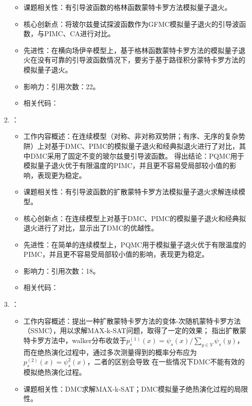 \begin{enumerate}
\begin{itemize}
                \item 课题相关性：有引导波函数的格林函数蒙特卡罗方法模拟量子退火。
                \item 核心创新点：将玻尔兹曼试探波函数作为GFMC模拟量子退火的引导波函数，与PIMC、CA进行对比。
                \item 先进性：在横向场伊辛模型上，基于格林函数蒙特卡罗方法的模拟量子退火在没有可靠的引导波函数情况下，要劣于基于路径积分蒙特卡罗方法的模拟量子退火。
                \item 影响力：引用次数：22。
                \item 相关代码：
            \end{itemize}
            \item \citet{inack2015simulated}：
            \begin{itemize}
                \item 工作内容概述：在连续模型（对称、非对称双势阱；有序、无序的复杂势阱）上对基于DMC、PIMC的模拟量子退火和经典拟退火进行了对比，其中DMC采用了固定不变的玻尔兹曼引导波函数。
                得出结论：PQMC用于模拟量子退火优于有限温度的PIMC，并且更不容易受局部较小值的影响，表现更为稳定。
                \item 课题相关性：有引导波函数的扩散蒙特卡罗方法模拟量子退火求解连续模型。
                \item 核心创新点：在连续模型上对基于DMC、PIMC的模拟量子退火和经典拟退火进行了对比，显示出了DMC的优越性。
                \item 先进性：在简单的连续模型上，PQMC用于模拟量子退火优于有限温度的PIMC，并且更不容易受局部较小值的影响，表现更为稳定。
                \item 影响力：引用次数：18。
                \item 相关代码：
            \end{itemize}
        \item \citet{jarret2016adiabatic}：
            \begin{itemize}
                \item 工作内容概述：提出一种扩散蒙特卡罗方法的变体-次随机蒙特卡罗方法（SSMC），用以求解MAX-k-SAT问题，取得了一定的效果；
                指出扩散蒙特卡罗方法中，walker分布收敛于$p_{s}^{(1)}(x)=\psi_{s}(x)/\sum_{y\in V}\psi_{s}(y)$，而在绝热演化过程中，通过多次测量得到的概率分布应为$p_{s}^{(2)}(x)=\psi_{s}^{2}(x)$，二者的区别会导致
                在一些情况下DMC不能有效的模拟绝热演化过程。
                \item 课题相关性：DMC求解MAX-k-SAT；DMC模拟量子绝热演化过程的局限性。

\end{itemize}
\end{enumerate}
